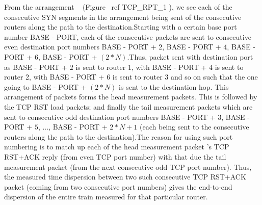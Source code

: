   From the arrangement ~ (Figure \ ref
			  {
			  TCP_RPT_1}
  ), we see each of the
    consecutive SYN segments in the arrangement being sent of the
    consecutive routers along the path to the destination.Starting with
    a certain base port number BASE - PORT, each of the consecutive packets
    are sent to consecutive even destination port numbers BASE - PORT + $2$,
    BASE - PORT + $4$, BASE - PORT + $6$, BASE - PORT + $ (2 * N) $.Thus,
    packet sent with destination port as BASE - PORT +
    $2$ is sent to router 1, with BASE - PORT + $4$ is sent to router 2,
    with BASE - PORT +
    $6$ is sent to router 3 and so on such that the one going to BASE - PORT +
    $ (2 *
       N) $ is sent to the destination hop.
    This arrangement of packets forms the head measurement packets.
    This is followed by the TCP RST load packets;
  and finally the tail measurement packets which are sent to consecutive odd destination port numbers BASE - PORT + $3$, BASE - PORT + $5$, ..., BASE - PORT + $2 * N + 1 $ (each being sent to the consecutive routers along the path to the destination).The reason for using such port numbering is to match up each of the head measurement packet 's TCP RST+ACK reply (from even TCP port number)
 with that due the tail measurement packet (from the next consecutive
 odd TCP port number). Thus, the measured time dispersion between two
 such consecutive TCP RST+ACK packet (coming from two consecutive port
 numbers) gives the end-to-end dispersion of the entire train measured
 for that particular router.\\


